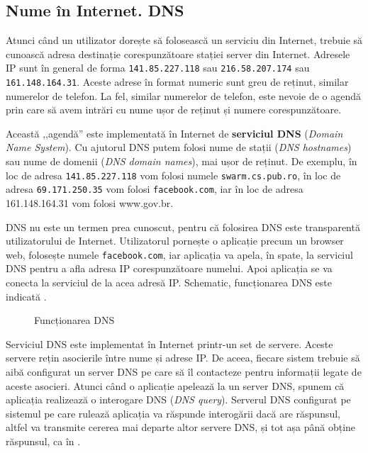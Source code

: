 \subsection{Nume în Internet. DNS}
\label{sec:net:internet:dns}

Atunci când un utilizator dorește să folosească un serviciu din Internet, trebuie să cunoască adresa destinație corespunzătoare stației server din Internet.
Adresele IP sunt în general de forma \texttt{141.85.227.118} sau \texttt{216.58.207.174} sau \texttt{161.148.164.31}.
Aceste adrese în format numeric sunt greu de reținut, similar numerelor de telefon.
La fel, similar numerelor de telefon, este nevoie de o agendă prin care să avem intrări cu nume ușor de reținut și numere corespunzătoare.

Această ,,agendă'' este implementată în Internet de \textbf{serviciul DNS} (\textit{Domain Name System}).
Cu ajutorul DNS putem folosi nume de stații (\textit{DNS hostnames}) sau nume de domenii (\textit{DNS domain names}), mai ușor de reținut.
De exemplu, în loc de adresa \texttt{141.85.227.118} vom folosi numele \texttt{swarm.cs.pub.ro}, în loc de adresa \texttt{69.171.250.35} vom folosi \texttt{facebook.com}, iar în loc de adresa 161.148.164.31 vom folosi www.gov.br.

DNS nu este un termen prea cunoscut, pentru că folosirea DNS este transparentă utilizatorului de Internet.
Utilizatorul pornește o aplicație precum un browser web, folosește numele \texttt{facebook.com}, iar aplicația va apela, în spate, la serviciul DNS pentru a afla adresa IP corespunzătoare numelui.
Apoi aplicația se va conecta la serviciul de la acea adresă IP.
Schematic, funcționarea DNS este indicată .

\begin{figure}[htbp]
  \centering
  \def\svgwidth{\columnwidth}
  
  \caption{Funcționarea DNS}
  \label{fig:net:dns}
\end{figure}

Serviciul DNS este implementat în Internet printr-un set de servere.
Aceste servere rețin asocierile între nume și adrese IP.
De aceea, fiecare sistem trebuie să aibă configurat un server DNS pe care să îl contacteze pentru informații legate de aceste asocieri.
Atunci când o aplicație apelează la un server DNS, spunem că aplicația realizează o interogare DNS (\textit{DNS query}).
Serverul DNS configurat pe sistemul pe care rulează aplicația va răspunde interogării dacă are răspunsul, altfel va transmite cererea mai departe altor servere DNS, și tot așa până obține răspunsul, ca în .

